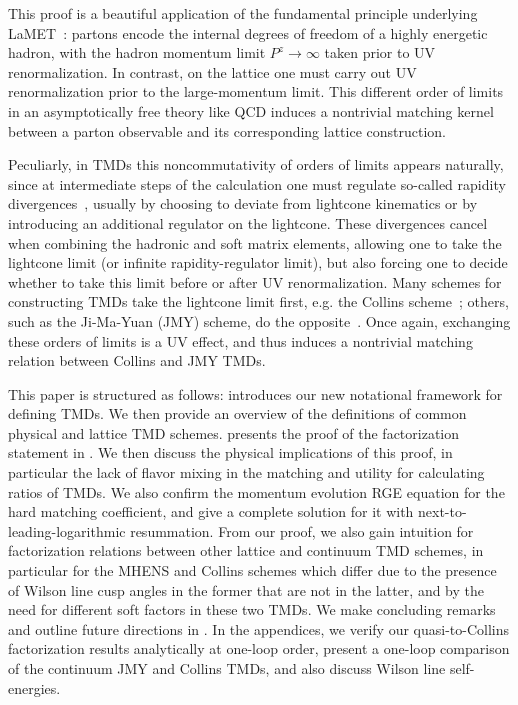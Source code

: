 \documentclass[11pt,a4paper]{article}
\begin{document}
This proof is a beautiful application of the fundamental principle underlying LaMET~\cite{Ji:2013dva,Ji:2014gla,Ji:2020ect}:
partons encode the internal degrees of freedom of a highly energetic hadron,
with the hadron momentum limit $P^z \to \infty$ taken prior to UV renormalization.
In contrast, on the lattice one must carry out UV renormalization prior to the large-momentum limit.
This different order of limits in an asymptotically free theory like QCD induces a nontrivial matching kernel between a parton observable and its corresponding lattice construction.

Peculiarly, in TMDs this noncommutativity of orders of limits appears naturally, since
at intermediate steps of the calculation one must regulate so-called rapidity divergences~\cite{Collins:1350496,Collins:1981uk,Beneke:2003pa,Ji:2004wu,Chiu:2007yn, Becher:2011dz,Chiu:2011qc,Chiu:2012ir,Chiu:2009yx, GarciaEchevarria:2011rb,Li:2016axz,Ebert:2018gsn}, usually by choosing to deviate from lightcone kinematics or by introducing an additional regulator on the lightcone.
These divergences cancel when combining the hadronic and soft matrix elements, allowing one to take the lightcone limit (or infinite rapidity-regulator limit), but also forcing one to decide whether to take this limit before or after UV renormalization.
Many schemes for constructing TMDs take the lightcone limit first, e.g. the Collins scheme~\cite{Collins:1350496};
others, such as the Ji-Ma-Yuan (JMY) scheme, do the opposite~\cite{Ji:2004wu}.
Once again, exchanging these orders of limits is a UV effect, and thus induces a nontrivial matching relation between Collins and JMY TMDs.

\vspace{0.2cm}

This paper is structured as follows: 
 introduces our new notational framework for defining TMDs.
We then provide an overview of the definitions of common physical and lattice TMD schemes. 
 presents the proof of the factorization statement in .
We then discuss the physical implications of this proof, in particular the lack of flavor mixing in the matching and utility for calculating ratios of TMDs. We also confirm the momentum evolution RGE equation for the hard matching coefficient, and give a complete solution for it with next-to-leading-logarithmic resummation. 
From our proof, we also gain intuition for factorization relations between other lattice and continuum TMD schemes, in 
particular for the MHENS and Collins schemes which differ due to the presence of Wilson line cusp angles in the former that are not in the latter, and by the need for different soft factors in these two TMDs.
We make concluding remarks and outline future directions in .
In the appendices, we verify our quasi-to-Collins factorization results analytically at one-loop order, present a one-loop comparison of the continuum JMY and Collins TMDs, and also discuss Wilson line self-energies. 
\end{document}

